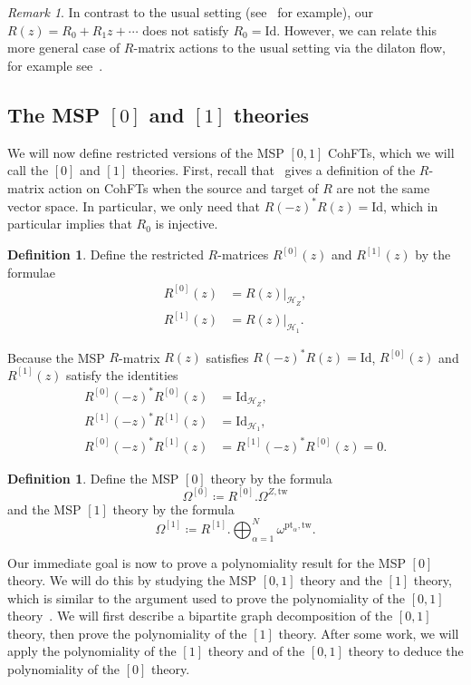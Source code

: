 \documentclass[10pt]{amsart}
\theoremstyle{definition}
\newtheorem{defn}[thm]{Definition}
\theoremstyle{remark}
\newtheorem{rmk}[thm]{Remark}
\theoremstyle{plain}
\theoremstyle{definition}
\theoremstyle{remark}
\newcommand{\msc}[1]{\mathscr{#1}}
\newcommand{\mr}[1]{\mathrm{#1}}
\newcommand{\1}{\mathbf{1}}
\newcommand{\2}{\mathbf{2}}
\newcommand{\3}{\mathbf{3}}
\newcommand{\pt}{\mr{pt}}
\newcommand{\tw}{\mr{tw}}
\numberwithin{equation}{section}
\begin{document}
\begin{rmk}
    In contrast to the usual setting (see~\cite{relationsvia3spin} for example), our $R(z) = R_0 + R_1 z + \cdots$ does not satisfy $R_0 = \mr{Id}$. However, we can relate this more general case of $R$-matrix actions to the usual setting via the dilaton flow, for example see~\cite[Appendix C]{nmsp3}.
\end{rmk}

\subsection{The MSP $[0]$ and $[1]$ theories}%
\label{sub:The MSP 0 and 1 theories}

We will now define restricted versions of the MSP $[0,1]$ CohFTs, which we will call the $[0]$ and $[1]$ theories. First, recall that~\cite[\S 2]{nmsp3} gives a definition of the $R$-matrix action on CohFTs when the source and target of $R$ are not the same vector space. In particular, we only need that $R(-z)^* R(z) = \mr{Id}$, which in particular implies that $R_0$ is injective.

\begin{defn}
    Define the restricted $R$-matrices $R^{[0]}(z)$ and $R^{[1]}(z)$ by the formulae
    \begin{align*}
        R^{[0]}(z) &= R(z)|_{\msc{H}_Z}, \\
        R^{[1]}(z) &= R(z)|_{\msc{H}_1}.
    \end{align*}
\end{defn}

Because the MSP $R$-matrix $R(z)$ satisfies $R(-z)^* R(z) = \mr{Id}$, $R^{[0]}(z)$ and $R^{[1]}(z)$ satisfy the identities
\begin{align*}
    R^{[0]}(-z)^* R^{[0]}(z) &= \mr{Id}_{\msc{H}_Z}, \\
    R^{[1]}(-z)^* R^{[1]}(z) &= \mr{Id}_{\msc{H}_1}, \\
    R^{[0]}(-z)^* R^{[1]}(z) &= R^{[1]}(-z)^* R^{[0]}(z) = 0 .
\end{align*}

\begin{defn}
    Define the MSP $[0]$ theory by the formula
    \[ \Omega^{[0]} \coloneqq R^{[0]}. \Omega^{Z,\tw} \]
    and the MSP $[1]$ theory by the formula
    \[ \Omega^{[1]} \coloneqq R^{[1]}. \bigoplus_{\alpha=1}^N \omega^{\pt_{\alpha},\tw}. \]
\end{defn}

Our immediate goal is now to prove a polynomiality result for the MSP $[0]$ theory. We will do this by studying the MSP $[0,1]$ theory and the $[1]$ theory, which is similar to the argument used to prove the polynomiality of the $[0,1]$ theory~\cite[Theorem 4.1]{polynomiality}. We will first describe a bipartite graph decomposition of the $[0,1]$ theory, then prove the polynomiality of the $[1]$ theory. After some work, we will apply the polynomiality of the $[1]$ theory and of the $[0,1]$ theory to deduce the polynomiality of the $[0]$ theory.
\end{document}
